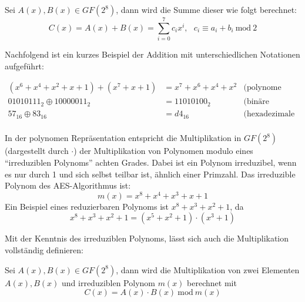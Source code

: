  \begin{center}
  \parbox{14cm}{\centering
   Sei $A(x), B(x) \in GF(2^8)$, dann wird die Summe dieser wie folgt berechnet:
   \begin{equation*}
    C(x) = A(x) + B(x) = \sum_{i=0}^7 c_ix^i, ~~~ c_i \equiv a_i + b_i ~\text{mod}~ 2
   \end{equation*}
  }
 \end{center} 
 
 Nachfolgend ist ein kurzes Beispiel der Addition mit unterschiedlichen Notationen
 aufgeführt:
 
 \begin{equation}
  \begin{aligned}
   (x^6 + x^4 +x^2 + x + 1) + (x^7 + x + 1) &= x^7 + x^6 + x^4 + x^2 & \text{(polynome Notation)} &\\
   01010111_2 \oplus 10000011_2 &= 11010100_2 & \text{(binäre Notation)} &\\
   57_{16} \oplus 83_{16} &= d4_{16} & \text{(hexadezimale Notation)} &\\
  \end{aligned}
  \label{math:addition}
 \end{equation}
 
 In der polynomen Repräsentation entspricht die Multiplikation in $GF(2^8)$ (dargestellt durch $\cdot$) der
 Multiplikation von Polynomen modulo eines ``irreduziblen Polynoms'' achten Grades. Dabei ist ein Polynom
 irreduzibel, wenn es nur durch 1 und sich selbst teilbar ist, ähnlich einer Primzahl. Das irreduzible
 Polynom des AES-Algorithmus ist:
  \begin{equation}
   m(x) = x^8 + x^4 + x^3 + x + 1
  \label{math:aes-polynom}
  \end{equation}
 Ein Beispiel eines reduzierbaren Polynoms ist $x^8 +x^3 + x^2 + 1$, da
 \begin{equation*}
   x^8 +x^3 + x^2 + 1 = (x^5 + x^2 + 1) \cdot (x^3 + 1)
 \end{equation*}
 
 Mit der Kenntnis des irreduziblen Polynoms, lässt sich auch die Multiplikation vollständig definieren:
 
 \begin{center}
  \parbox{13cm}{\centering
   Sei $A(x), B(x) \in GF(2^8)$, dann wird die Multiplikation von zwei Elementen $A(x), B(x)$
   und irreduziblen Polynom $m(x)$ berechnet mit
   \begin{equation*}
    C(x) = A(x) \cdot B(x) ~\text{mod}~ m(x)
   \end{equation*}
  }
 \end{center} 
 
